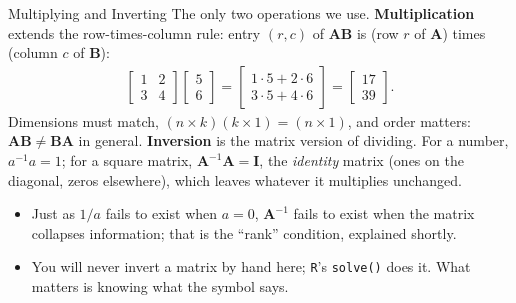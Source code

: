 \documentclass[aspectratio=169,11pt,xcolor=dvipsnames]{beamer}
\newcommand{\Ix}{\bm{I}}
\begin{document}
\begin{frame}{Multiplying and Inverting}
The only two operations we use. \textbf{Multiplication} extends the
row-times-column rule: entry $(r,c)$ of $\bm{AB}$ is (row $r$ of $\bm A$)
times (column $c$ of $\bm B$):
\begin{align*}
  \begin{bmatrix} 1 & 2 \\ 3 & 4 \end{bmatrix}
  \begin{bmatrix} 5 \\ 6 \end{bmatrix}
  =
  \begin{bmatrix} 1\cdot 5 + 2\cdot 6 \\ 3\cdot 5 + 4\cdot 6\end{bmatrix}
  = \begin{bmatrix} 17 \\ 39 \end{bmatrix}.
\end{align*}
Dimensions must match, $(n\times k)(k\times 1) = (n\times 1)$, and order
matters: $\bm{AB}\neq\bm{BA}$ in general.
\vskip2pt
\textbf{Inversion} is the matrix version of dividing. For a number,
$a^{-1}a = 1$; for a square matrix, $\bm A^{-1}\bm A = \Ix$, the
\emph{identity} matrix (ones on the diagonal, zeros elsewhere), which leaves
whatever it multiplies unchanged.
\begin{itemize}\itemsep2pt
  \item Just as $1/a$ fails to exist when $a = 0$, $\bm A^{-1}$ fails to exist
        when the matrix collapses information; that is the ``rank'' condition,
        explained shortly.
  \item You will never invert a matrix by hand here; \texttt{R}'s
        \texttt{solve()} does it. What matters is knowing what the symbol says.
\end{itemize}
\end{frame}
\end{document}
